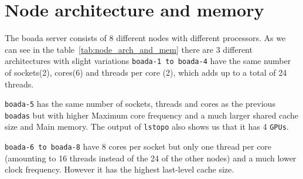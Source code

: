 \pagebreak
\tableofcontents
\pagebreak
{} 

\section{Node architecture and memory}%
\label{sec:node_architecture_and_memory}


The boada server consists of 8 different nodes with different processors. As we can see in
the table~\ref{tab:node_arch_and_mem} there are 3 different architectures with slight variations
\texttt{boada-1 to boada-4} have the same number of sockets(2), cores(6) and threads per core (2), which adds up to a total of 24 threads.

\texttt{boada-5} has the same number of sockets, threads and cores as the previous \texttt{boadas} but with higher Maximum core frequency and a much larger shared cache size and Main memory.
The output of \texttt{lstopo} also shows us that it has 4 \texttt{GPUs}.

\texttt{boada-6 to boada-8} have 8 cores per socket but only one thread per core (amounting to 16 threads instead of the 24 of the other nodes) and a much lower clock frequency. However it has the
highest last-level cache size.

